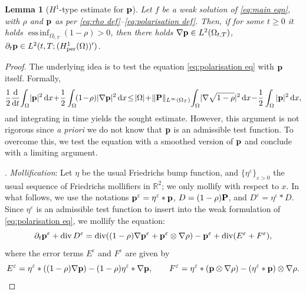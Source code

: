 \documentclass[10pt,a4paper]{amsart}
\newtheorem{lemma}{Lemma}
\renewcommand{\P}{{\bf P}}
\renewcommand{\d}{\, \mathrm{d} }
\newcommand{\der}{\mathrm{d}}
\DeclareMathOperator{\dv}{div}
\DeclareMathOperator{\essinf}{ess \, inf}
\newcommand{\p}{{\bf p}}
\newcommand{\per}{\mathrm{per}}
\begin{document}
\begin{lemma}[$H^1$-type estimate for $\p$]\label{lem:H1 p}
  Let $f$ be a weak solution of \eqref{eq:main eqn}, with $\rho$ and $\p$ as per \eqref{eq:rho def}--\eqref{eq:polarisation def}. Then,  if for some $t\geq 0$ it holds $\essinf_{\Omega_{t,T}}(1-\rho)>0$, then there holds  $\nabla \p \in L^2(\Omega_{t,T})$, $\partial_t \p \in L^2(t,T;(H^1_\per(\Omega))')$. 
\end{lemma}

\begin{proof}
    The underlying idea is to test the equation \eqref{eq:polarisation eq} with $\p$ itself. Formally, 
    \begin{equation*}
    \begin{aligned}
         \frac{1}{2}\frac{\der}{\der t}\!\int_\Omega\! |\p|^2 \d x \!+\! \frac{1}{2}\int_\Omega\! (1\!-\!\rho) |\nabla \p|^2 \d x \!\leq\! |\Omega| \!+\! \Vert \P \Vert_{L^\infty(\Omega_T)} \! \int_\Omega\! |\nabla \sqrt{1-\rho}|^2 \d x \!-\! \frac{1}{2}\int_\Omega |\p|^2 \d x, 
    \end{aligned}
\end{equation*}
and integrating in time yields the sought estimate. However, this argument is not rigorous since \emph{a priori} we do not know that $\p$ is an admissible test function. To overcome this, we test the equation with a smoothed version of $\p$ and conclude with a limiting argument. 

    \smallskip 

    . \textit{Mollification}: Let $\eta$ be the usual Friedrichs bump function, and $\{\eta^\varepsilon\}_{\varepsilon>0}$ the usual sequence of Friedrichs mollifiers in $\mathbb{R}^2$; we only mollify with respect to $x$. In what follows, we use the notations $\p^\varepsilon = \eta^\varepsilon*\p$, $D = (1-\rho)\P$, and $D^\varepsilon = \eta^\varepsilon*D$. Since $\eta^\varepsilon$ is an admissible test function to insert into the weak formulation of \eqref{eq:polarisation eq}, we mollify the equation: 
    \begin{equation}\label{eq:mollified p eqn}
        \partial_t \p^\varepsilon + \dv D^\varepsilon = \dv((1-\rho)\nabla\p^\varepsilon + \p^\varepsilon \otimes \nabla \rho) - \p^\varepsilon + \dv (E^\varepsilon + F^\varepsilon), 
    \end{equation}
    where the error terms $E^\varepsilon$ and $F^\varepsilon$ are given by 
    \begin{equation}\label{eq:error terms mollified p eqn}
        E^\varepsilon = \eta^\varepsilon*((1-\rho)\nabla \p) - (1-\rho)\eta^\varepsilon*\nabla \p , \qquad F^\varepsilon = \eta^\varepsilon*(\p \otimes \nabla \rho) - (\eta^\varepsilon*\p )\otimes \nabla \rho. 
    \end{equation}


\end{proof}
\end{document}
